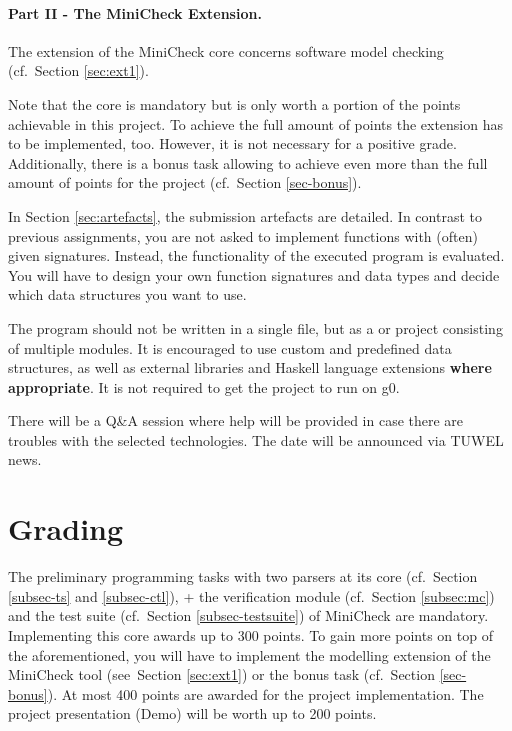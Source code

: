 \documentclass{article}
\begin{document}
\paragraph{Part II - The MiniCheck Extension.} The extension of the MiniCheck core concerns software model checking (cf.~Section \ref{sec:ext1}).

Note that the core is mandatory but is only worth a portion of the points achievable in this project. 
To achieve the full amount of points the extension has to be implemented, too.
However, it is not necessary for a positive grade. 
Additionally, there is a bonus task allowing to achieve even more than 
the full amount of points for the project (cf.~Section \ref{sec-bonus}). 
\bigskip

In Section \ref{sec:artefacts}, the submission artefacts are detailed. In contrast to previous assignments, you are not asked to implement functions with (often) given signatures. 
Instead, the functionality of the executed program is evaluated. 
You will have to design your own function signatures and data types and decide 
which data structures you want to use.

The program should not be written in a single file, but as a \href{https://docs.haskellstack.org/en/stable/README/}{} 
or \href{https://cabal.readthedocs.io/en/3.4/}{} project consisting of multiple modules. 
It is encouraged to use custom and predefined data structures, as well as external libraries 
and Haskell language extensions \textbf{where appropriate}. It is not required to get the project to run on g0.

There will be a Q\&A session where help will be provided in case there are troubles with the selected technologies. 
The date will be announced via TUWEL news.

\section{Grading}
The preliminary programming tasks with two parsers at its core (cf.~Section \ref{subsec-ts} and \ref{subsec-ctl}), +
the verification module (cf.~Section \ref{subsec:mc}) and the test suite (cf.~Section \ref{subsec-testsuite}) 
of MiniCheck are mandatory. 
Implementing this core awards up to 300 points.
To gain more points on top of the aforementioned, you will have to implement the modelling
extension of the MiniCheck tool (see~Section \ref{sec:ext1}) 
or the bonus task (cf.~Section \ref{sec-bonus}). 
At most 400 points are awarded for the project implementation.
The project presentation (Demo) will be worth up to 200 points. 
\end{document}
